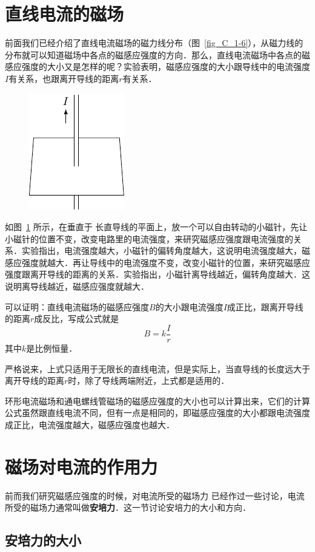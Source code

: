 \section{直线电流的磁场}
前面我们已经介绍了直线电流磁场的磁力线分布（图~\ref{fig_C_1-6}），从磁力线的分布就可以知道磁场中各点的磁感应强度的方向．那么，直线电流磁场中各点的磁感应强度的大小又是怎样的呢？实验表明，磁感应强度的大小跟导线中的电流强度$I$有关系，也跟离开导线的距离$r$有关系．
\begin{figure}[htbp]
    \centering
    \includegraphics{fig/C/1-20.pdf}
    \caption{ }\label{fig_C_1-20}
\end{figure}

如图~\ref{fig_C_1-20} 所示，在垂直于
长直导线的平面上，放一个可以自由转动的小磁针，先让小磁针的位置不变，改变电路里的电流强度，来研究磁感应强度跟电流强度的关系．实验指出，电流强度越大，小磁针的偏转角度越大，这说明电流强度越大，磁感应强度就越大．再让导线中的电流强度不变，改变小磁针的位置，来研究磁感应强度跟离开导线的距离的关系．实验指出，小磁针离导线越近，偏转角度越大．这说明离导线越近，磁感应强度就越大．

可以证明：直线电流磁场的磁感应强度$B$的大小跟电流强度$I$成正比，跟离开导线的距离$r$成反比，写成公式就是
\[B=k\frac{I}{r}\]
其中$k$是比例恒量．

严格说来，上式只适用于无限长的直线电流，但是实际上，当直导线的长度远大于离开导线的距离$r$时，除了导线两端附近，上式都是适用的．

环形电流磁场和通电螺线管磁场的磁感应强度的大小也可以计算出来，它们的计算公式虽然跟直线电流不同，但有一点是相同的，即磁感应强度的大小都跟电流强度成正比，电流强度越大，磁感应强度也越大．

\section{磁场对电流的作用力}
前而我们研究磁感应强度的时候，对电流所受的磁场力
已经作过一些讨论，电流所受的磁场力通常叫做\textbf{安培力}．这一节讨论安培力的大小和方向．

\subsection{安培力的大小}

